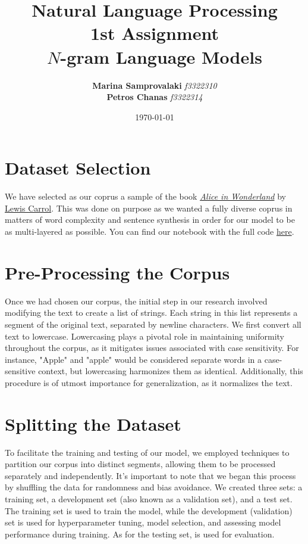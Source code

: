 \documentclass[11pt,onside]{article}
\title{\blue \textbf{Natural Language Processing} \\
\blue 1st Assignment \\ \(N\)-gram Language Models}
\author{\textbf{Marina Samprovalaki} \textit{f3322310} \\ \textbf{Petros Chanas} \textit{f3322314} }
\date{\today} %
\begin{document}
\maketitle

\section*{Dataset Selection}
We have selected as our coprus a sample of the book \href{https://en.wikipedia.org/wiki/Alice%27s_Adventures_in_Wonderland}{\textit{Alice in Wonderland}} by \href{https://en.wikipedia.org/wiki/Lewis_Carroll}{Lewis Carrol}. This was done on purpose as we wanted a fully diverse coprus in matters of word complexity and sentence synthesis in order for our model to be as multi-layered as possible. You can find our notebook with the full code \href{https://colab.research.google.com/drive/1vNeEjUFaHNf8esvHM9vQNERQQEozdfaX?usp=sharing}{here}.

\section*{Pre-Processing the Corpus}
Once we had chosen our corpus, the initial step in our research involved modifying the text to create a list of strings. Each string in this list represents a segment of the original text, separated by newline characters. We first convert all text to lowercase. Lowercasing plays a pivotal role in maintaining uniformity throughout the corpus, as it mitigates issues associated with case sensitivity. For instance, "Apple" and "apple" would be considered separate words in a case-sensitive context, but lowercasing harmonizes them as identical. Additionally, this procedure is of utmost importance for generalization, as it normalizes the text.

\section*{Splitting the Dataset}
To facilitate the training and testing of our model, we employed techniques to partition our corpus into distinct segments, allowing them to be processed separately and independently. It's important to note that we began this process by shuffling the data for randomness and bias avoidance. We created three sets: a training set, a development set (also known as a validation set), and a test set. The training set is used to train the model, while the development (validation) set is used for hyperparameter tuning, model selection, and assessing model performance during training. As for the testing set, is used for evaluation.
\end{document}
